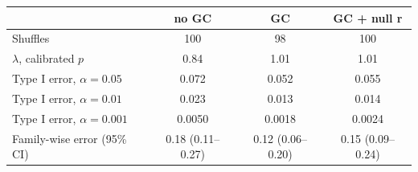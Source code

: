 \begin{tabular*}{\linewidth}{@{\extracolsep{\fill}}lccc}
\toprule
 & no GC & GC & GC + null r \\
\midrule
Shuffles & 100 & 98 & 100 \\
$\lambda$, calibrated $p$ & 0.84 & 1.01 & 1.01 \\
Type I error, $\alpha = 0.05$ & 0.072 & 0.052 & 0.055 \\
Type I error, $\alpha = 0.01$ & 0.023 & 0.013 & 0.014 \\
Type I error, $\alpha = 0.001$ & 0.0050 & 0.0018 & 0.0024 \\
Family-wise error (95\% CI) & 0.18 (0.11--0.27) & 0.12 (0.06--0.20) & 0.15 (0.09--0.24) \\
\bottomrule
\end{tabular*}
